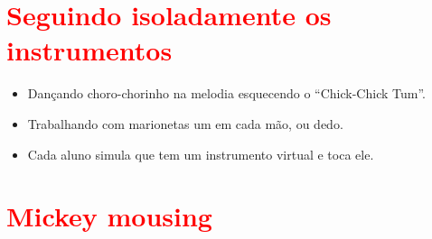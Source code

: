 \section{\textcolor{red}{Seguindo isoladamente os instrumentos}}
\begin{itemize}
\item Dançando choro-chorinho na melodia esquecendo o ``Chick-Chick Tum''.
\item Trabalhando com marionetas um em cada mão, ou dedo.
\item Cada aluno simula que tem um instrumento virtual e toca ele.
\end{itemize}

\section{\textcolor{red}{Mickey mousing}}

